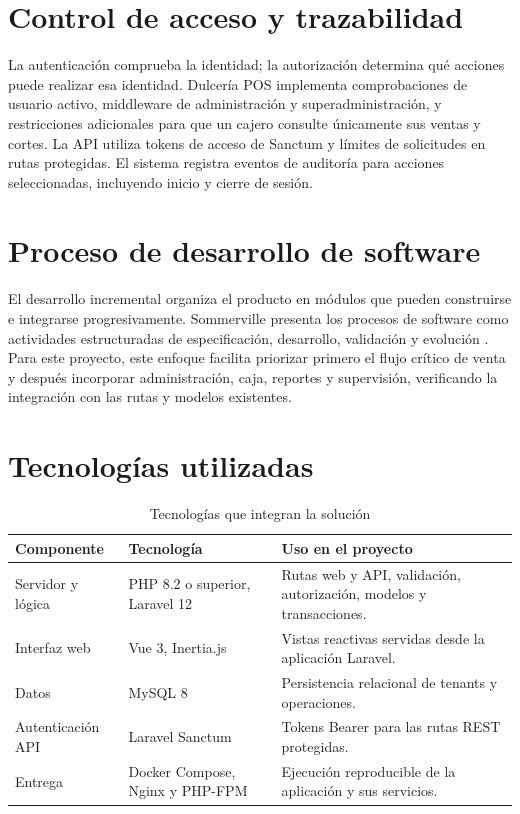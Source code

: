 \section{Control de acceso y trazabilidad}

La autenticación comprueba la identidad; la autorización determina qué acciones puede realizar esa identidad. Dulcería POS implementa comprobaciones de usuario activo, middleware de administración y superadministración, y restricciones adicionales para que un cajero consulte únicamente sus ventas y cortes. La API utiliza tokens de acceso de Sanctum y límites de solicitudes en rutas protegidas. El sistema registra eventos de auditoría para acciones seleccionadas, incluyendo inicio y cierre de sesión.

\section{Proceso de desarrollo de software}

El desarrollo incremental organiza el producto en módulos que pueden construirse e integrarse progresivamente. Sommerville presenta los procesos de software como actividades estructuradas de especificación, desarrollo, validación y evolución \cite{sommerville2015}. Para este proyecto, este enfoque facilita priorizar primero el flujo crítico de venta y después incorporar administración, caja, reportes y supervisión, verificando la integración con las rutas y modelos existentes.

\section{Tecnologías utilizadas}

\begin{table}[htbp]
\centering
\caption{Tecnologías que integran la solución}
\label{tab:tecnologias}
\begin{tabularx}{\textwidth}{|>{\raggedright\arraybackslash}p{3.1cm}|>{\raggedright\arraybackslash}p{3.4cm}|X|}
\hline
\textbf{Componente} & \textbf{Tecnología} & \textbf{Uso en el proyecto} \\
\hline
Servidor y lógica & PHP 8.2 o superior, Laravel 12 & Rutas web y API, validación, autorización, modelos y transacciones. \\
\hline
Interfaz web & Vue 3, Inertia.js & Vistas reactivas servidas desde la aplicación Laravel. \\
\hline
Datos & MySQL 8 & Persistencia relacional de tenants y operaciones. \\
\hline
Autenticación API & Laravel Sanctum & Tokens Bearer para las rutas REST protegidas. \\
\hline
Entrega & Docker Compose, Nginx y PHP-FPM & Ejecución reproducible de la aplicación y sus servicios. \\
\hline
\end{tabularx}
\end{table}